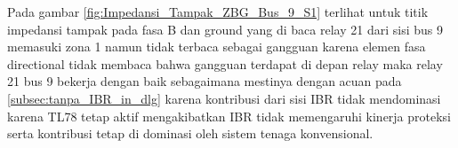 Pada gambar \ref{fig:Impedansi_Tampak_ZBG_Bus_9_S1} terlihat untuk titik impedansi tampak pada fasa B dan ground yang di baca relay 21 dari sisi bus 9 memasuki zona 1 namun tidak terbaca sebagai gangguan karena elemen fasa directional tidak membaca bahwa gangguan terdapat di depan relay maka relay 21 bus 9 bekerja dengan baik sebagaimana mestinya dengan acuan pada \ref{subsec:tanpa_IBR_in_dlg} karena kontribusi dari sisi IBR tidak mendominasi karena TL78 tetap aktif mengakibatkan IBR tidak memengaruhi kinerja proteksi serta kontribusi tetap di dominasi oleh sistem tenaga konvensional.







